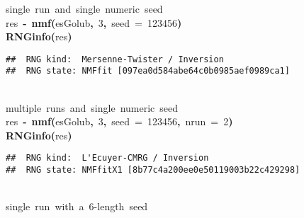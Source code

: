 \documentclass[a4paper]{article}\usepackage{graphicx, color}
\makeatletter
\newcommand{\hlnumber}[1]{\textcolor[rgb]{0,0,0}{#1}}%
\newcommand{\hlfunctioncall}[1]{\textcolor[rgb]{0.501960784313725,0,0.329411764705882}{\textbf{#1}}}%
\newcommand{\hlkeyword}[1]{\textcolor[rgb]{0,0,0}{\textbf{#1}}}%
\newcommand{\hlargument}[1]{\textcolor[rgb]{0.690196078431373,0.250980392156863,0.0196078431372549}{#1}}%
\newcommand{\hlcomment}[1]{\textcolor[rgb]{0.180392156862745,0.6,0.341176470588235}{#1}}%
\newcommand{\hlassignement}[1]{\textcolor[rgb]{0,0,0}{\textbf{#1}}}%
\newcommand{\hlsymbol}[1]{\textcolor[rgb]{0,0,0}{#1}}%
\newcommand{\hlstd}[1]{\textcolor[rgb]{0,0,0}{#1}}%
\newenvironment{kframe}{%
 \def\FrameCommand##1{\hskip\@totalleftmargin \hskip-\fboxsep
 \colorbox{shadecolor}{##1}\hskip-\fboxsep
     \hskip-\linewidth \hskip-\@totalleftmargin \hskip\columnwidth}%
 \MakeFramed {\advance\hsize-\width
   \@totalleftmargin\z@ \linewidth\hsize
   \@setminipage}}%
 {\par\unskip\endMakeFramed}
\newenvironment{knitrout}{}{} %
\makeatother
\begin{document}
\begin{knitrout}
\color{fgcolor}\begin{kframe}
\begin{flushleft}
\ttfamily\noindent
\hlcomment{\usebox{\hlnormalsizeboxhash}{\ }single{\ }run{\ }and{\ }single{\ }numeric{\ }seed}\hspace*{\fill}\\
\hlstd{}\hlsymbol{res}{\ }\hlassignement{\usebox{\hlnormalsizeboxlessthan}-}{\ }\hlfunctioncall{nmf}\hlkeyword{(}\hlsymbol{esGolub}\hlkeyword{,}{\ }\hlnumber{3}\hlkeyword{,}{\ }\hlargument{seed}{\ }\hlargument{=}{\ }\hlnumber{123456}\hlkeyword{)}\hspace*{\fill}\\
\hlstd{}\hlfunctioncall{RNGinfo}\hlkeyword{(}\hlsymbol{res}\hlkeyword{)}\mbox{}
\normalfont
\end{flushleft}
\begin{verbatim}
##  RNG kind:  Mersenne-Twister / Inversion 
##  RNG state: NMFfit [097ea0d584abe64c0b0985aef0989ca1] 
\end{verbatim}
\begin{flushleft}
\ttfamily\noindent
\hspace*{\fill}\\
\hlstd{}\hlcomment{\usebox{\hlnormalsizeboxhash}{\ }multiple{\ }runs{\ }and{\ }single{\ }numeric{\ }seed}\hspace*{\fill}\\
\hlstd{}\hlsymbol{res}{\ }\hlassignement{\usebox{\hlnormalsizeboxlessthan}-}{\ }\hlfunctioncall{nmf}\hlkeyword{(}\hlsymbol{esGolub}\hlkeyword{,}{\ }\hlnumber{3}\hlkeyword{,}{\ }\hlargument{seed}{\ }\hlargument{=}{\ }\hlnumber{123456}\hlkeyword{,}{\ }\hlargument{nrun}{\ }\hlargument{=}{\ }\hlnumber{2}\hlkeyword{)}\hspace*{\fill}\\
\hlstd{}\hlfunctioncall{RNGinfo}\hlkeyword{(}\hlsymbol{res}\hlkeyword{)}\mbox{}
\normalfont
\end{flushleft}
\begin{verbatim}
##  RNG kind:  L'Ecuyer-CMRG / Inversion 
##  RNG state: NMFfitX1 [8b77c4a200ee0e50119003b22c429298] 
\end{verbatim}
\begin{flushleft}
\ttfamily\noindent
\hspace*{\fill}\\
\hlstd{}\hlcomment{\usebox{\hlnormalsizeboxhash}{\ }single{\ }run{\ }with{\ }a{\ }6-length{\ }seed}\hspace*{\fill}\\

\end{flushleft}
\end{kframe}
\end{knitrout}
\end{document}
